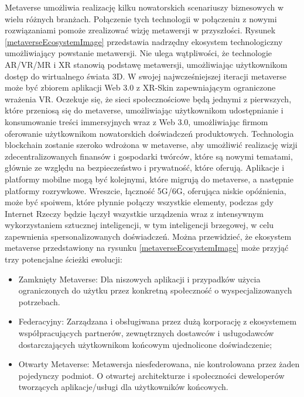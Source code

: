 Metaverse umożliwia realizację kilku nowatorskich scenariuszy biznesowych w wielu różnych branżach. Połączenie tych technologii w połączeniu z nowymi rozwiązaniami pomoże zrealizować wizję metawersji w przyszłości. Rysunek \ref{metaverseEcosystemImage} przedstawia nadrzędny ekosystem technologiczny umożliwiający powstanie metawersji. Nie ulega wątpliwości, że technologie AR/VR/MR i XR stanowią podstawę metawersji, umożliwiając użytkownikom dostęp do wirtualnego świata 3D. W swojej najwcześniejszej iteracji metaverse może być zbiorem aplikacji Web 3.0 z XR-Skin zapewniającym ograniczone wrażenia VR. Oczekuje się, że sieci społecznościowe będą jednymi z pierwszych, które przeniosą się do metaverse, umożliwiając użytkownikom udostępnianie i konsumowanie treści immersyjnych wraz z Web 3.0, umożliwiając firmom oferowanie użytkownikom nowatorskich doświadczeń produktowych. Technologia blockchain zostanie szeroko wdrożona w metaverse, aby umożliwić realizację wizji zdecentralizowanych finansów i gospodarki twórców, które są nowymi tematami, głównie ze względu na bezpieczeństwo i prywatność, które oferują. Aplikacje i platformy mobilne mogą być kolejnymi, które migrują do metaverse, a następnie platformy rozrywkowe. Wreszcie, łączność 5G/6G, oferująca niskie opóźnienia, może być spoiwem, które płynnie połączy wszystkie elementy, podczas gdy Internet Rzeczy będzie łączył wszystkie urządzenia wraz z intensywnym wykorzystaniem sztucznej inteligencji, w tym inteligencji brzegowej, w celu zapewnienia spersonalizowanych doświadczeń\cite{metaverseSecurityIssuesChallengesAndViableZTAModel}. 
Można przewidzieć, że ekosystem metaverse przedstawiony na rysunku \ref{metaverseEcosystemImage} może przyjąć trzy potencjalne ścieżki ewolucji:

\begin{itemize}
    \item Zamknięty Metaverse: Dla niszowych aplikacji i przypadków użycia ograniczonych do użytku przez konkretną społeczność o wyspecjalizowanych potrzebach.
    \item Federacyjny: Zarządzana i obsługiwana przez dużą korporację z ekosystemem współpracujących partnerów, zewnętrznych dostawców i usługodawców dostarczających użytkownikom końcowym ujednolicone doświadczenie;  
    \item Otwarty Metaverse: Metawersja niesfederowana, nie kontrolowana przez żaden pojedynczy podmiot. O otwartej architekturze i społeczności deweloperów tworzących aplikacje/usługi dla użytkowników końcowych.
\end{itemize}



